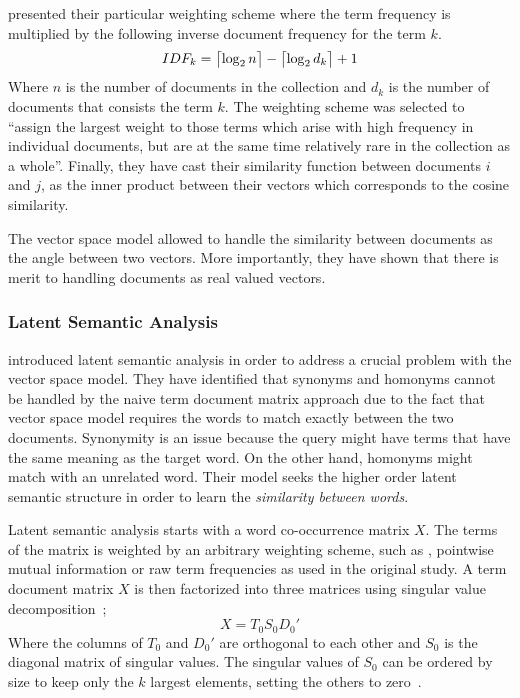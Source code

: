 \citeauthor{salton_vector_1975} presented their particular weighting scheme where the term frequency is multiplied by the following inverse document frequency for the term $k$.
\begin{displaymath}
IDF_{k} = \ceil[\big]{\log_{2}n} - \ceil[\big]{\log_{2}d_{k}} + 1
\end{displaymath}
Where $n$ is the number of documents in the collection and $d_k$ is the number of documents that consists the term $k$.
The weighting scheme was selected to \enquote{assign the largest weight to those terms which arise with high frequency in individual documents, but are at the same time relatively rare in the collection as a whole}.
Finally, they have cast their similarity function between documents $i$ and $j$, as the inner product between their vectors which corresponds to the cosine similarity.

The vector space model allowed \citeauthor{salton_vector_1975} to handle the similarity between documents as the angle between two vectors.
More importantly, they have shown that there is merit to handling documents as real valued vectors.

\subsubsection{Latent Semantic Analysis}%
\label{ssub:latent_semantic_analysis}

\textcite{deerwester_indexing_1990} introduced latent semantic analysis in order to address a crucial problem with the vector space model.
They have identified that synonyms and homonyms cannot be handled by the naive term document matrix approach due to the fact that vector space model requires the words to match exactly between the two documents.
Synonymity is an issue because the query might have terms that have the same meaning as the target word.
On the other hand, homonyms might match with an unrelated word.
Their model seeks the higher order latent semantic structure in order to learn the \emph{similarity between words}.

Latent semantic analysis starts with a word co-occurrence matrix $X$.
The terms of the matrix is weighted by an arbitrary weighting scheme, such as \tfidf{}, pointwise mutual information\cite{church_word_1990} or raw term frequencies as used in the original study.
A term document matrix $X$ is then factorized into three matrices using singular value decomposition~\cite{forsythe_computer_1977};
\begin{displaymath}
    X = T_{0}S_{0}D_{0}'
\end{displaymath}
Where the columns of $T_{0}$ and $D_{0}'$ are orthogonal to each other and $S_{0}$ is the diagonal matrix of singular values.
The singular values of $S_{0}$ can be ordered by size to keep only the $k$ largest elements, setting the others to zero~\cite{deerwester_indexing_1990}.

